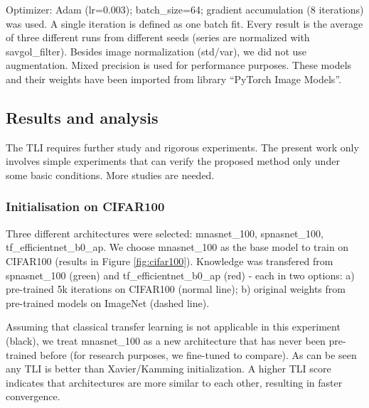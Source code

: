 \documentclass{article} %
\begin{document}
Optimizer: Adam (lr=0.003); batch\_size=64; gradient accumulation (8 iterations) was used.
A single iteration is defined as one batch fit.
%
Every result is the average of three different runs from different seeds (series
are normalized with savgol\_filter).
%
Besides image normalization (std/var), we did not use augmentation.
%
Mixed precision is used for performance purposes.
%
These models and their weights have been imported from \citep{rw2019timm} library
``PyTorch Image Models''.

\subsection{Results and analysis}

The TLI requires further study and rigorous experiments.
%
The present work only involves simple experiments that can verify the proposed method only under some basic conditions.
%
More studies are needed.

\subsubsection{Initialisation on CIFAR100}

Three different architectures were selected: mnasnet\_100, spnasnet\_100,
tf\_efficientnet\_b0\_ap.
%
We choose mnasnet\_100 as the base model to train on
CIFAR100 (results in Figure \ref{fig:cifar100}).
%
Knowledge was transfered from spnasnet\_100 (green) and
tf\_efficientnet\_b0\_ap (red) - each in two options:
a) pre-trained 5k iterations on CIFAR100 (normal line);
b) original weights from pre-trained models on ImageNet (dashed line).

Assuming that classical transfer learning is not applicable in this experiment
(black), we treat mnasnet\_100 as a new architecture that has never been
pre-trained before (for research purposes, we fine-tuned to compare).
%
As can be seen any TLI is better than Xavier/Kamming initialization.
%
A higher TLI score indicates that architectures are more similar to each other,
resulting in faster convergence.
\end{document}
